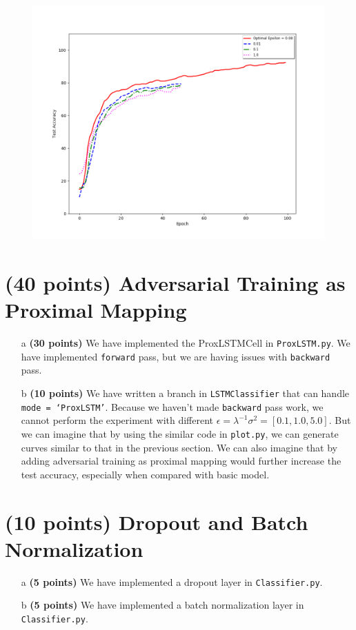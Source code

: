 \documentclass[11pt]{report}
\begin{document}
\begin{itemize}
    \begin{figure}[h]
    	\includegraphics[width = 15 cm]{AdvModel.png}
    	\centering
	\end{figure}

\end{itemize}

	


\section{(40 points) Adversarial Training as Proximal Mapping}
\begin{itemize}
    \item[a] \textbf{(30 points)} We have implemented the ProxLSTMCell in \texttt{ProxLSTM.py}. We have implemented \texttt{forward} pass, but we are having issues with \texttt{backward} pass. 
    \item[b] \textbf{(10 points)} We have written a branch in \texttt{LSTMClassifier} that can handle \texttt{mode = `ProxLSTM'}. 
    Because we haven't made \texttt{backward} pass work, we cannot perform the experiment with different $\epsilon = \lambda^{-1}\sigma^2 = [0.1, 1.0, 5.0]$. 
    But we can imagine that by using the similar code in \texttt{plot.py}, we can generate curves similar to that in the previous section. 
    We can also imagine that by adding adversarial training as proximal mapping would further increase the test accuracy, especially when compared with basic model. 
\end{itemize}

\section{(10 points) Dropout and Batch Normalization}
\begin{itemize}
    \item[a] \textbf{(5 points)} We have implemented a dropout layer in \texttt{Classifier.py}.
    \item[b] \textbf{(5 points)} We have implemented a batch normalization layer in \texttt{Classifier.py}. 
\end{itemize}
\end{document}
